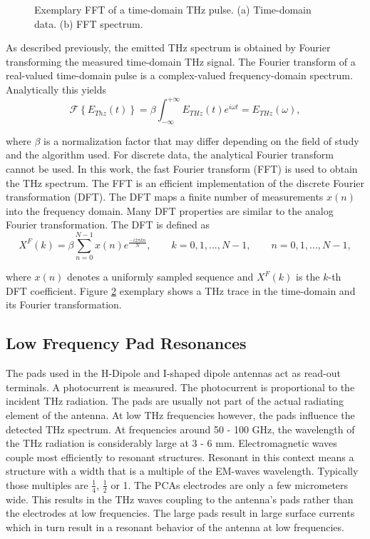 \begin{figure}[!]
\begin{minipage}{\textwidth}
\begin{subfigure}[t]{0.48\textwidth}
            \caption{\centering}
            \label{ghjkl}
        \end{subfigure}
        \caption{Exemplary FFT of a time-domain THz pulse. (a) Time-domain data. (b) FFT spectrum.}
        \label{fig:FFT}
    \end{minipage}
\end{figure}

As described previously, the emitted THz spectrum is obtained by Fourier transforming the measured time-domain THz signal. The Fourier transform of a real-valued time-domain pulse is a complex-valued frequency-domain spectrum. Analytically this yields \cite{MathematicalMethodsPhysics} 
\begin{equation}
    \mathcal{F}\left\{
        E_{Thz}(t) 
    \right\} = \beta \int_{-\infty}^{+\infty} E_{THz}(t)e^{i\omega t} = E_{THz}(\omega),
\end{equation}

where $\beta$ is a normalization factor that may differ depending on the field of study and the algorithm used. For discrete data, the analytical Fourier transform cannot be used. In this work, the fast Fourier transform (FFT) is used to obtain the THz spectrum. The FFT is an efficient implementation of the discrete Fourier transformation (DFT). The DFT maps a finite number of measurements $x(n)$ into the frequency domain. Many DFT properties are similar to the analog Fourier transformation. The DFT is defined as \cite{raoFastFourierTransform2010}
\begin{equation}
    X^F(k) = \beta \sum_{n = 0}^{N - 1}x(n)e^{\frac{-i2\pi k n}{N}}, \qquad k = 0, 1, ..., N-1, \qquad n = 0, 1, ..., N-1,
\end{equation}

where $x(n)$ denotes a uniformly sampled sequence and $X^F(k)$ is the $k$-th DFT coefficient. Figure \ref{fig:FFT} exemplary shows a THz trace in the time-domain and its Fourier transformation.

\subsection{Low Frequency Pad Resonances}
The pads used in the H-Dipole and I-shaped dipole antennas act as read-out terminals. A photocurrent is measured. The photocurrent is proportional to the incident THz radiation.  The pads are usually not part of the actual radiating element of the antenna. At low THz frequencies however, the pads influence the detected THz spectrum. At frequencies around \num{50} - \num{100} \si{\giga \hertz}, the wavelength of the THz radiation is considerably large at \num{3} - \num{6} \si{\milli \meter}. Electromagnetic waves couple most efficiently to resonant structures. Resonant in this context means a structure with a width that is a multiple of the EM-waves wavelength. Typically those multiples are $\frac{1}{4}$, $\frac{1}{2}$ or \num{1}. The PCAs electrodes are only a few micrometers wide. This results in the THz waves coupling to the antenna's pads rather than the electrodes at low frequencies. The large pads result in large surface currents which in turn result in a resonant behavior of the antenna at low frequencies. 

